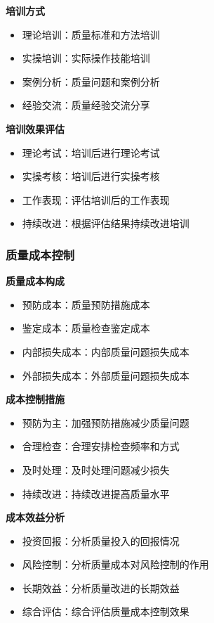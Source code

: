 \documentclass[UTF8,a4paper,12pt]{article}
\begin{document}
\textbf{培训方式}
\begin{itemize}
    \item 理论培训：质量标准和方法培训
    \item 实操培训：实际操作技能培训
    \item 案例分析：质量问题和案例分析
    \item 经验交流：质量经验交流分享
\end{itemize}

\textbf{培训效果评估}
\begin{itemize}
    \item 理论考试：培训后进行理论考试
    \item 实操考核：培训后进行实操考核
    \item 工作表现：评估培训后的工作表现
    \item 持续改进：根据评估结果持续改进培训
\end{itemize}

\subsubsection{质量成本控制}
\textbf{质量成本构成}
\begin{itemize}
    \item 预防成本：质量预防措施成本
    \item 鉴定成本：质量检查鉴定成本
    \item 内部损失成本：内部质量问题损失成本
    \item 外部损失成本：外部质量问题损失成本
\end{itemize}

\textbf{成本控制措施}
\begin{itemize}
    \item 预防为主：加强预防措施减少质量问题
    \item 合理检查：合理安排检查频率和方式
    \item 及时处理：及时处理问题减少损失
    \item 持续改进：持续改进提高质量水平
\end{itemize}

\textbf{成本效益分析}
\begin{itemize}
    \item 投资回报：分析质量投入的回报情况
    \item 风险控制：分析质量成本对风险控制的作用
    \item 长期效益：分析质量改进的长期效益
    \item 综合评估：综合评估质量成本控制效果
\end{itemize}
\end{document}
